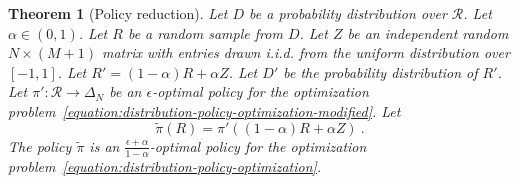 \documentclass[12pt]{article}
\newcommand{\Requests}{\mathcal{R}}
\newtheorem{theorem}{Theorem}
\theoremstyle{definition}
\begin{document}
\begin{theorem}[Policy reduction]
\label{theorem:policy-reduction}
Let $D$ be a probability distribution over $\Requests$. Let $\alpha \in (0,1)$.
Let $R$ be a random sample from $D$. Let $Z$ be an independent random $N \times
(M+1)$ matrix with entries drawn i.i.d. from the uniform distribution over
$[-1,1]$. Let $R' = (1-\alpha)R + \alpha Z$. Let $D'$ be the probability
distribution of $R'$. Let $\pi':\Requests \to \Delta_N$ be an $\epsilon$-optimal
policy for the optimization
problem~\eqref{equation:distribution-policy-optimization-modified}. Let
$$
\widetilde{\pi}(R) = \pi'((1-\alpha)R + \alpha Z) \: .
$$
The policy $\widetilde{\pi}$ is an $\frac{\epsilon + \alpha}{1-\alpha}$-optimal
policy for the optimization
problem~\eqref{equation:distribution-policy-optimization}.
\end{theorem}
\end{document}
